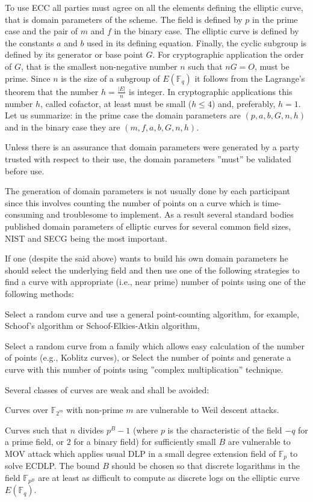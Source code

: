 \documentclass[12pt]{article}
\begin{document}
To use ECC all parties must agree on all the elements defining the elliptic curve, that is domain parameters of the scheme. The field is defined by $p$ in the prime case and the pair of $m$ and $f$ in the binary case. The elliptic curve is defined by the constants $a$ and $b$ used in its defining equation. Finally, the cyclic subgroup is defined by its generator or base point $G$. For cryptographic application the order of $G$, that is the smallest non-negative number $n$ such that $n G = O$, must be prime. Since $n$ is the size of a subgroup of $E(\mathbb{F}_q)$ it follows from the Lagrange's theorem that the number $h = \frac{|E|}{n}$ is integer. In cryptographic applications this number $h$, called cofactor, at least must be small ($h \le 4$) and, preferably, $h = 1$. Let us summarize: in the prime case the domain parameters are $(p, a, b, G, n, h)$ and in the binary case they are $(m, f, a, b, G, n, h)$.

Unless there is an assurance that domain parameters were generated by a party trusted with respect to their use, the domain parameters ''must'' be validated before use. %

The generation of domain parameters is not usually done by each participant since this involves counting the number of points on a curve which is time-consuming and troublesome to implement. As a result several standard bodies published domain parameters of elliptic curves for several common field sizes, NIST and SECG being the most important.

If one (despite the said above) wants to build his own domain parameters he should select the underlying field and then use one of the following strategies to find a curve with appropriate (i.e., near prime) number of points using one of the following methods:

Select a random curve and use a general point-counting algorithm, for example, Schoof's algorithm or Schoof-Elkies-Atkin algorithm,

Select a random curve from a family which allows easy calculation of the number of points (e.g., Koblitz curves), or
Select the number of points and generate a curve with this number of points using ''complex multiplication'' technique.

Several classes of curves are weak and shall be avoided:

Curves over $\mathbb{F}_{2^m}$ with non-prime $m$ are vulnerable to Weil descent attacks.

Curves such that $n$ divides $p^B-1$ (where $p$ is the characteristic of the field $-q$ for a prime field, or $2$ for a binary field) for sufficiently small $B$ are vulnerable to MOV attack which applies usual DLP in a small degree extension field of $\mathbb{F}_p$ to solve ECDLP. The bound $B$ should be chosen so that discrete logarithms in the field $\mathbb{F}_{p^B}$ are at least as difficult to compute as discrete logs on the elliptic curve $E(\mathbb{F}_q)$.
\end{document}
